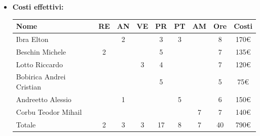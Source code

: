 \begin{itemize}
\begin{longtable}{|c|c|c|c|}
        \hline
        \end{longtable}
    \item \textbf{Costi effettivi:}
    \begin{longtable}{|p{}|c|c|c|c|c|c|c|c|}
        \hline
        Nome & RE & AN & VE & PR & PT & AM & Ore & Costi\\
        \hline
        Ibra \newline Elton & &2 & &3 &3 & &8 & 170€\\
        \hline
        Beschin Michele &2 & & &5 & & &7 & 135€\\
        \hline
        Lotto \newline Riccardo & & &3 &4 & & &7 & 120€\\
        \hline
        Bobirica Andrei Cristian & & & &5 & & &5 & 75€\\
        \hline
        Andreetto Alessio & &1 & & &5 & &6 & 150€\\
        \hline
        Corbu Teodor Mihail & & & & & &7 &7 & 140€\\
        \hline
        Totale &2 &3 &3 &17 &8 &7 &40 & 790€\\
        \hline
    \end{longtable}
    \end{itemize}


